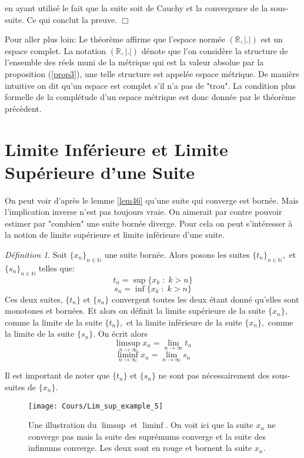\documentclass[oneside,12pt,french,table]{book}
\theoremstyle{definition}
\theoremstyle{plain}
\theoremstyle{remark}
\newtheorem{defi}[definition]{Définition}
\newcommand{\Nn}{{\mathbb{N}}}
\newcommand{\Rr}{{\mathbb{R}}}
\begin{document}
en ayant utilisé le fait que la suite soit de Cauchy et la convergence de la sous-suite. Ce qui conclut la preuve. $\Box$   
\newline 
\newline 
\begin{tcolorbox}
Pour aller plus loin:
Le théorème affirme que l'espace normée $(\Rr, |.|)$ est un espace complet. La notation $(\Rr, |.|)$ dénote que l'on considère la structure de l'ensemble des réels muni de la métrique qui est la valeur absolue par la proposition (\ref{prop3}), une telle structure est appelée espace métrique. De manière intuitive on dit qu'un espace est complet s'il n'a pas de "trou". La condition plus formelle de la complétude d'un espace métrique est donc donnée par le théorème précèdent. 
\end{tcolorbox}

\section{Limite Inférieure et Limite Supérieure d'une Suite}
On peut voir d'après le lemme \ref{lem46} qu'une suite qui converge est 
bornée. Mais l'implication inverse n'est pas toujours vraie. On aimerait par contre pouvoir estimer par "combien" une suite bornée diverge. 
Pour cela on peut s'intéresser à la notion de limite supérieure et limite inférieure d'une suite.

\begin{defi}
    Soit $\{x_n\}_{n\in \Nn}$ une suite bornée. Alors posons les suites $\{t_n\}_{n\in\Nn},$ et $\{s_n\}_{n\in \Nn}$ telles que:
    \[
    t_n = \sup\{x_k \; : \; k > n\}
    \]
    \[
    s_n = \inf\{x_k \; : \; k > n\}
    \]
    Ces deux suites, $\{t_n\}$ et $\{s_n\}$ convergent toutes les deux 
    étant donné qu'elles sont monotones et bornées. Et alors on définit la 
    limite supérieure de la suite $\{x_n\},$ comme la limite de la suite 
    $\{t_n\}, $ et la limite inférieure de la suite $\{x_n\},$ comme la 
    limite de la suite $\{s_n\}.$ On écrit alors 
    \[
    \limsup_{n \rightarrow \infty} x_n = \lim_{n \rightarrow \infty} t_n
    \]
    \[
    \liminf_{n \rightarrow \infty} x_n = \lim_{n \rightarrow \infty} s_n
    \]
    
\end{defi} 
Il est important de noter que $\{t_n\}$ et $\{s_n\}$ ne sont pas nécessairement des sous-suites de $\{x_n\}.$ 

\begin{figure}[H]
    \centering
    \texttt{[image: Cours/Lim\_sup\_example\_5]}
    \caption{Une illustration du $\limsup$ et $\liminf.$ 
    On voit ici que la suite $x_n$ ne converge pas mais la suite des suprémums converge et la suite des infimums converge. Les deux sont en rouge et bornent la suite $x_n$.}
    \label{fig:Cours/Lim_sup_example_5}
\end{figure}
\end{document}

